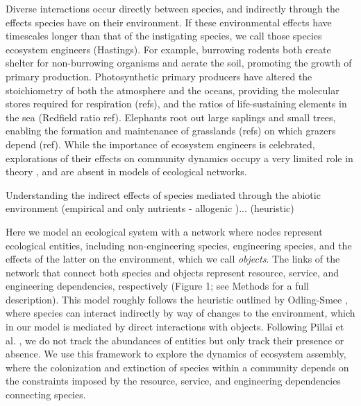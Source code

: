 \documentclass[9pt,twocolumn,twoside]{pnas-new}
\begin{document}
Diverse interactions occur directly between species, and indirectly through the effects species have on their environment.
If these environmental effects have timescales longer than that of the instigating species, we call those species ecosystem engineers (Hastings).
For example, burrowing rodents both create shelter for non-burrowing organisms and aerate the soil, promoting the growth of primary production.
Photosynthetic primary producers have altered the stoichiometry of both the atmosphere and the oceans, providing the molecular stores required for respiration (refs), and the ratios of life-sustaining elements in the sea (Redfield ratio ref).
Elephants root out large saplings and small trees, enabling the formation and maintenance of grasslands (refs) on which grazers depend (ref).
While the importance of ecosystem engineers is celebrated, explorations of their effects on community dynamics occupy a very limited role in theory \cite{Hastings2007,OdlingSmee2013}, and are absent in models of ecological networks.

Understanding the indirect effects of species mediated through the abiotic environment \cite{Olff2009} (empirical and only nutrients - allogenic \cite{Jones1994})... \cite{OdlingSmee2013} (heuristic)


Here we model an ecological system with a network where nodes represent ecological entities, including non-engineering species, engineering species, and the effects of the latter on the environment, which we call \emph{objects}.
The links of the network that connect both species and objects represent resource, service, and engineering dependencies, respectively (Figure 1; see Methods for a full description).
This model roughly follows the heuristic outlined by Odling-Smee \cite{OdlingSmee2013}, where species can interact indirectly by way of changes to the environment, which in our model is mediated by direct interactions with objects.
Following Pillai et al. \cite{Pillai2011}, we do not track the abundances of entities but only track their presence or absence.
We use this framework to explore the dynamics of ecosystem assembly, where the colonization and extinction of species within a community depends on the constraints imposed by the resource, service, and engineering dependencies connecting species.
\end{document}
